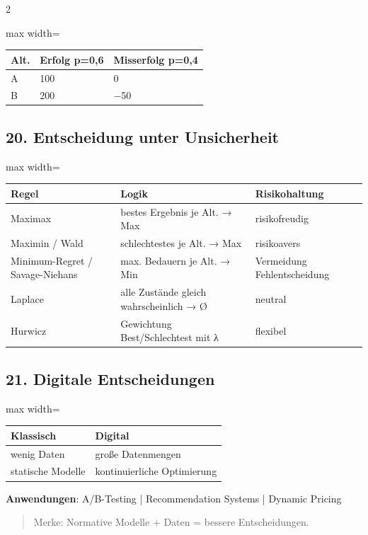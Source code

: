 \documentclass[10pt, a4paper]{article}
\begin{document}
\begin{multicols}{2}
{\small
\begin{adjustbox}{max width=\linewidth}
{\scriptsize
\begin{tabular}{lll}
\toprule
\textbf{Alt.} & \textbf{Erfolg p=0,6} & \textbf{Misserfolg p=0,4} \\
\midrule
A & 100 & 0 \\
B & 200 & −50 \\
\bottomrule
\end{tabular}
}
\end{adjustbox}
}



\subsection{20. Entscheidung unter Unsicherheit}


{\small
\begin{adjustbox}{max width=\linewidth}
{\scriptsize
\begin{tabular}{lll}
\toprule
\textbf{Regel} & \textbf{Logik} & \textbf{Risikohaltung} \\
\midrule
Maximax & bestes Ergebnis je Alt. → Max & risikofreudig \\
Maximin / Wald & schlechtestes je Alt. → Max & risikoavers \\
Minimum-Regret / Savage-Niehans & max. Bedauern je Alt. → Min & Vermeidung Fehlentscheidung \\
Laplace & alle Zustände gleich wahrscheinlich → Ø & neutral \\
Hurwicz & Gewichtung Best/Schlechtest mit λ & flexibel \\
\bottomrule
\end{tabular}
}
\end{adjustbox}
}



\subsection{21. Digitale Entscheidungen}


{\small
\begin{adjustbox}{max width=\linewidth}
{\scriptsize
\begin{tabular}{ll}
\toprule
\textbf{Klassisch} & \textbf{Digital} \\
\midrule
wenig Daten & große Datenmengen \\
statische Modelle & kontinuierliche Optimierung \\
\bottomrule
\end{tabular}
}
\end{adjustbox}
}


\textbf{Anwendungen}: A/B-Testing | Recommendation Systems | Dynamic Pricing


\begin{quote}
Merke: Normative Modelle + Daten = bessere Entscheidungen.
\end{quote}







\end{multicols}
\end{document}

